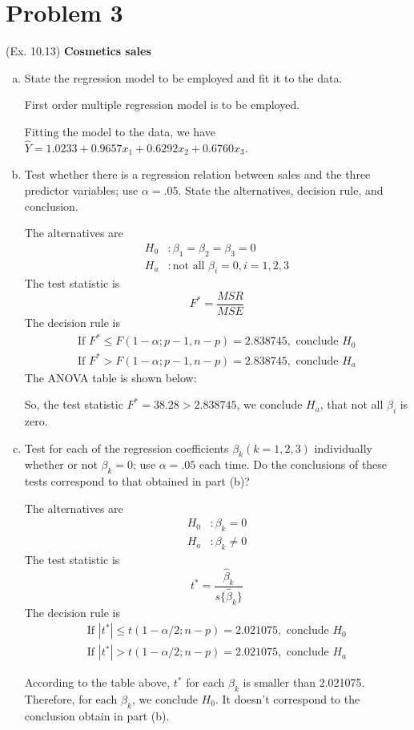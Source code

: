 \documentclass[10pt]{report}
\newcommand{\abs}[1] {\left| #1 \right|}
\begin{document}
\section*{Problem 3}
(Ex. 10.13) \textbf{Cosmetics sales}
\begin{enumerate}[a.]
	\item 
	State the regression model to be employed and fit it to the data.
	
	First order multiple regression model is to be employed.
	
	Fitting the model to the data, we have $\hat{Y}=1.0233 + 0.9657 x_1 + 0.6292 x_2 + 0.6760 x_3$.
	
	\item 
	Test whether there is a regression relation between sales and the three predictor variables; use $\alpha = .05$. State the alternatives, decision rule, and conclusion.
	
	The alternatives are
	\begin{align*}
		H_0 &: \beta_1 = \beta_2 = \beta_3 = 0\\
		H_a &: \text{not all } \beta_i=0, i=1,2,3
	\end{align*}
	The test statistic is
	\[
	F^* = \frac{MSR}{MSE}
	\]
	The decision rule is
	\begin{align*}
		\text{If } F^* \le F(1-\alpha; p-1, n-p) = 2.838745, \text{ conclude } H_0\\
		\text{If } F^* > F(1-\alpha; p-1, n-p) = 2.838745, \text{ conclude } H_a
	\end{align*}
	The ANOVA table is shown below:
	
	So, the test statistic $F^* = 38.28 > 2.838745$, we conclude $H_a$, that not all $\beta_i$ is zero.
	
	\item 
	Test for each of the regression coefficients $\beta_k (k=1,2,3)$ individually whether or not $\beta_k=0$; use $\alpha = .05$ each time. Do the conclusions of these tests correspond to that obtained in part (b)?
	
	The alternatives are
	\begin{align*}
		H_0 &: \beta_k = 0\\
		H_a &: \beta_k \ne 0
	\end{align*}
	The test statistic is
	\[
	t^* = \frac{\hat{\beta}_k}{s\{\hat{\beta}_k\}}
	\]
	The decision rule is
	\begin{align*}
		\text{If } \abs{t^*} \le t(1-\alpha/2; n-p) = 2.021075, \text{ conclude } H_0\\
		\text{If } \abs{t^*} > t(1-\alpha/2; n-p) = 2.021075, \text{ conclude } H_a
	\end{align*}
	
	According to the table above, $t^*$ for each $\beta_k$ is smaller than 2.021075. Therefore, for each $\beta_k$, we conclude $H_0$. It doesn't correspond to the conclusion obtain in part (b).
	

\end{enumerate}
\end{document}
